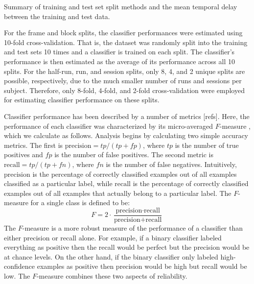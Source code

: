 \documentclass[preprint,authoryear,12pt]{elsarticle}
\begin{document}
\begin{table}
\centering

\caption{Summary of training and test set split methods and the mean temporal delay between the training and test data.}
\label{tab:training-split}
\end{table}

For the frame and block splits, the classifier performances were estimated using 10-fold cross-validation.
That is, the dataset was randomly split into the training and test sets 10 times and a classifier is trained on each split.
The classifier's performance is then estimated as the average of its performance across all 10 splits.
For the half-run, run, and session splits, only 8, 4, and 2 unique splits are possible, respectively, due to the much smaller number of runs and sessions per subject. 
Therefore, only 8-fold, 4-fold, and 2-fold cross-validation were employed for estimating classifier performance on these splits.

Classifier performance has been described by a number of metrics [refs]. 
Here, the performance of each classifier was characterized by its micro-averaged $F$-measure \citep{Ozgur2005}, which we calculate as follows. 
Analysis begins by calculating two simple accuracy metrics.
The first is $\mbox{precision} = tp / (tp + fp)$, where $tp$ is the number of true positives and $fp$ is the number of false positives.
The second metric is $\mbox{recall} = tp / (tp + fn)$, where $fn$ is the number of false negatives.
Intuitively, $\mbox{precision}$ is the percentage of correctly classified examples out of all examples classified as a particular label, while $\mbox{recall}$ is the percentage of correctly classified examples out of all examples that actually belong to a particular label.
The $F$-measure for a single class is defined to be:
\begin{equation}
F = 2 \cdot \frac{\mbox{precision} \cdot \mbox{recall}}{\mbox{precision} + \mbox{recall}}
\label{eqn:f1}
\end{equation}
The $F$-measure is a more robust measure of the performance of a classifier than either precision or recall alone.
For example, if a binary classifier labeled everything as positive then the recall would be perfect but the precision would be at chance levels.
On the other hand, if the binary classifier only labeled high-confidence examples as positive then precision would be high but recall would be low.
The $F$-measure combines these two aspects of reliability.
\end{document}
